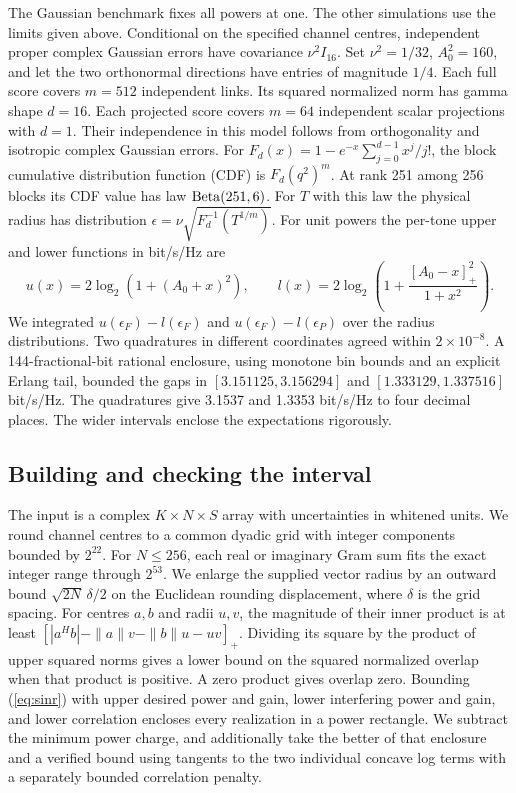 \documentclass[11pt,letterpaper]{article}
\newcommand{\pos}[1]{\left[#1\right]_{+}}
\begin{document}
The Gaussian benchmark fixes all powers at one. The other simulations use the limits given above. Conditional on the specified channel centres, independent proper complex Gaussian errors have covariance \(\nu^2 I_{16}\). Set \(\nu^2=1/32\), \(A_0^2=160\), and let the two orthonormal directions have entries of magnitude \(1/4\). Each full score covers \(m=512\) independent links. Its squared normalized norm has gamma shape \(d=16\). Each projected score covers \(m=64\) independent scalar projections with \(d=1\). Their independence in this model follows from orthogonality and isotropic complex Gaussian errors. For \(F_d(x)=1-e^{-x}\sum_{j=0}^{d-1}x^j/j!\), the block cumulative distribution function (CDF) is \(F_d(q^2)^m\). At rank 251 among 256 blocks its CDF value has law \({\rm Beta}(251,6)\). For \(T\) with this law the physical radius has distribution \(\epsilon=\nu\sqrt{F_d^{-1}(T^{1/m})}\). For unit powers the per-tone upper and lower functions in bit/s/Hz are
\[
 u(x)=2\log_2(1+(A_0+x)^2),\qquad
 l(x)=2\log_2\!\left(1+\frac{\pos{A_0-x}^2}{1+x^2}\right).
\]
We integrated \(u(\epsilon_F)-l(\epsilon_F)\) and \(u(\epsilon_F)-l(\epsilon_P)\) over the radius distributions. Two quadratures in different coordinates agreed within \(2\times10^{-8}\). A 144-fractional-bit rational enclosure, using monotone bin bounds and an explicit Erlang tail, bounded the gaps in \([3.151125,3.156294]\) and \([1.333129,1.337516]\) bit/s/Hz. The quadratures give 3.1537 and 1.3353 bit/s/Hz to four decimal places. The wider intervals enclose the expectations rigorously.

\subsection*{Building and checking the interval}
The input is a complex \(K\times N\times S\) array with uncertainties in whitened units. We round channel centres to a common dyadic grid with integer components bounded by \(2^{22}\). For \(N\leq256\), each real or imaginary Gram sum fits the exact integer range through \(2^{53}\). We enlarge the supplied vector radius by an outward bound \(\sqrt{2N}\,\delta/2\) on the Euclidean rounding displacement, where \(\delta\) is the grid spacing. For centres \(a,b\) and radii \(u,v\), the magnitude of their inner product is at least \(\pos{|a^Hb|-\|a\|v-\|b\|u-uv}\). Dividing its square by the product of upper squared norms gives a lower bound on the squared normalized overlap when that product is positive. A zero product gives overlap zero. Bounding (\ref{eq:sinr}) with upper desired power and gain, lower interfering power and gain, and lower correlation encloses every realization in a power rectangle. We subtract the minimum power charge, and additionally take the better of that enclosure and a verified bound using tangents to the two individual concave log terms with a separately bounded correlation penalty.
\end{document}
